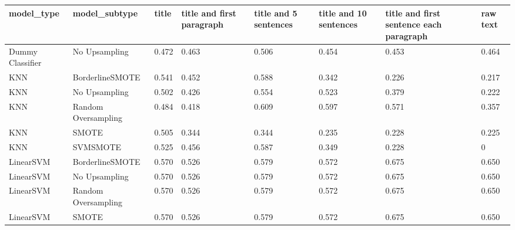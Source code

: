\begin{tabular}{llllllll}
\toprule
                  model\_type &       model\_subtype & title & title and first paragraph & title and 5 sentences & title and 10 sentences & title and first sentence each paragraph &  raw text \\
\midrule
            Dummy Classifier &       No Upsampling & 0.472 &                     0.463 &                 0.506 &                  0.454 &                                   0.453 &     0.464 \\
                         KNN &     BorderlineSMOTE & 0.541 &                     0.452 &                 0.588 &                  0.342 &                                   0.226 &     0.217 \\
                         KNN &       No Upsampling & 0.502 &                     0.426 &                 0.554 &                  0.523 &                                   0.379 &     0.222 \\
                         KNN & Random Oversampling & 0.484 &                     0.418 &                 0.609 &                  0.597 &                                   0.571 &     0.357 \\
                         KNN &               SMOTE & 0.505 &                     0.344 &                 0.344 &                  0.235 &                                   0.228 &     0.225 \\
                         KNN &            SVMSMOTE & 0.525 &                     0.456 &                 0.587 &                  0.349 &                                   0.228 &         0 \\
                   LinearSVM &     BorderlineSMOTE & 0.570 &                     0.526 &                 0.579 &                  0.572 &                                   0.675 &     0.650 \\
                   LinearSVM &       No Upsampling & 0.570 &                     0.526 &                 0.579 &                  0.572 &                                   0.675 &     0.650 \\
                   LinearSVM & Random Oversampling & 0.570 &                     0.526 &                 0.579 &                  0.572 &                                   0.675 &     0.650 \\
                   LinearSVM &               SMOTE & 0.570 &                     0.526 &                 0.579 &                  0.572 &                                   0.675 &     0.650 \\

\end{tabular}
